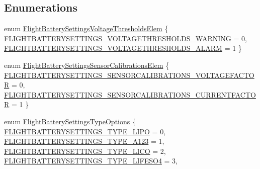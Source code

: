 \subsection*{\-Enumerations}
\begin{DoxyCompactItemize}
\item 
enum \hyperlink{group___flight_battery_settings_ga5de400afae35bbb453c218e4d87ca7d2}{\-Flight\-Battery\-Settings\-Voltage\-Thresholds\-Elem} \{ \hyperlink{group___flight_battery_settings_gga5de400afae35bbb453c218e4d87ca7d2a4910fa2c010bb1588fecaafd6b6909b9}{\-F\-L\-I\-G\-H\-T\-B\-A\-T\-T\-E\-R\-Y\-S\-E\-T\-T\-I\-N\-G\-S\-\_\-\-V\-O\-L\-T\-A\-G\-E\-T\-H\-R\-E\-S\-H\-O\-L\-D\-S\-\_\-\-W\-A\-R\-N\-I\-N\-G} = 0, 
\hyperlink{group___flight_battery_settings_gga5de400afae35bbb453c218e4d87ca7d2a26bc0cd6f793a73e0f4bfc4b07c21872}{\-F\-L\-I\-G\-H\-T\-B\-A\-T\-T\-E\-R\-Y\-S\-E\-T\-T\-I\-N\-G\-S\-\_\-\-V\-O\-L\-T\-A\-G\-E\-T\-H\-R\-E\-S\-H\-O\-L\-D\-S\-\_\-\-A\-L\-A\-R\-M} = 1
 \}
\item 
enum \hyperlink{group___flight_battery_settings_ga99d773df8364f9a2d6a8d7f79428c7ce}{\-Flight\-Battery\-Settings\-Sensor\-Calibrations\-Elem} \{ \hyperlink{group___flight_battery_settings_gga99d773df8364f9a2d6a8d7f79428c7cea0df97d02d4febaeeeeae3e14c711a8eb}{\-F\-L\-I\-G\-H\-T\-B\-A\-T\-T\-E\-R\-Y\-S\-E\-T\-T\-I\-N\-G\-S\-\_\-\-S\-E\-N\-S\-O\-R\-C\-A\-L\-I\-B\-R\-A\-T\-I\-O\-N\-S\-\_\-\-V\-O\-L\-T\-A\-G\-E\-F\-A\-C\-T\-O\-R} = 0, 
\hyperlink{group___flight_battery_settings_gga99d773df8364f9a2d6a8d7f79428c7cea939c33a47ed2a4818c57beb5e6dec85f}{\-F\-L\-I\-G\-H\-T\-B\-A\-T\-T\-E\-R\-Y\-S\-E\-T\-T\-I\-N\-G\-S\-\_\-\-S\-E\-N\-S\-O\-R\-C\-A\-L\-I\-B\-R\-A\-T\-I\-O\-N\-S\-\_\-\-C\-U\-R\-R\-E\-N\-T\-F\-A\-C\-T\-O\-R} = 1
 \}
\item 
enum \hyperlink{group___flight_battery_settings_ga1c8e1982080629262503c2a810321f1e}{\-Flight\-Battery\-Settings\-Type\-Options} \{ \*
\hyperlink{group___flight_battery_settings_gga1c8e1982080629262503c2a810321f1eae96b7f0fdacb10aecbb5da7a171b65ff}{\-F\-L\-I\-G\-H\-T\-B\-A\-T\-T\-E\-R\-Y\-S\-E\-T\-T\-I\-N\-G\-S\-\_\-\-T\-Y\-P\-E\-\_\-\-L\-I\-P\-O} = 0, 
\hyperlink{group___flight_battery_settings_gga1c8e1982080629262503c2a810321f1eaa9bb98c557dbb504bdb08ab30f2f90d5}{\-F\-L\-I\-G\-H\-T\-B\-A\-T\-T\-E\-R\-Y\-S\-E\-T\-T\-I\-N\-G\-S\-\_\-\-T\-Y\-P\-E\-\_\-\-A123} = 1, 
\hyperlink{group___flight_battery_settings_gga1c8e1982080629262503c2a810321f1ea98126299b84b169ff4bd9142bb4c9b8f}{\-F\-L\-I\-G\-H\-T\-B\-A\-T\-T\-E\-R\-Y\-S\-E\-T\-T\-I\-N\-G\-S\-\_\-\-T\-Y\-P\-E\-\_\-\-L\-I\-C\-O} = 2, 
\hyperlink{group___flight_battery_settings_gga1c8e1982080629262503c2a810321f1ea1eacf7712c622e08190c06d2180813d9}{\-F\-L\-I\-G\-H\-T\-B\-A\-T\-T\-E\-R\-Y\-S\-E\-T\-T\-I\-N\-G\-S\-\_\-\-T\-Y\-P\-E\-\_\-\-L\-I\-F\-E\-S\-O4} = 3, 

\end{DoxyCompactItemize}
